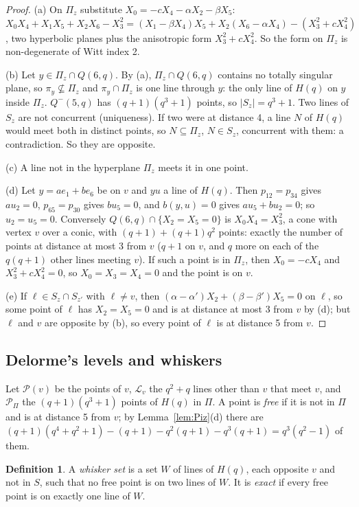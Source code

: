 \documentclass[11pt]{amsart}
\theoremstyle{definition}
\newtheorem{definition}[theorem]{Definition}
\theoremstyle{remark}
\numberwithin{equation}{section}
\newcommand{\cL}{\mathcal L}
\newcommand{\cP}{\mathcal P}
\begin{document}
\begin{proof}
(a) On $\Pi_z$ substitute $X_0=-cX_4-\alpha X_2-\beta X_5$:
$X_0X_4+X_1X_5+X_2X_6-X_3^2=(X_1-\beta X_4)X_5+X_2(X_6-\alpha X_4)-(X_3^2+cX_4^2)$, two hyperbolic planes plus the
anisotropic form $X_3^2+cX_4^2$. So the form on $\Pi_z$ is non-degenerate of Witt index 2.

(b) Let $y\in\Pi_z\cap Q(6,q)$. By (a), $\Pi_z\cap Q(6,q)$ contains no totally singular plane, so $\pi_y\not\subseteq\Pi_z$
and $\pi_y\cap\Pi_z$ is one line through $y$: the only line of $H(q)$ on $y$ inside $\Pi_z$. $Q^-(5,q)$ has
$(q+1)(q^3+1)$ points, so $|S_z|=q^3+1$. Two lines of $S_z$ are not concurrent (uniqueness). If two were at distance 4, a
line $N$ of $H(q)$ would meet both in distinct points, so $N\subseteq\Pi_z$, $N\in S_z$, concurrent with them: a
contradiction. So they are opposite.

(c) A line not in the hyperplane $\Pi_z$ meets it in one point.

(d) Let $y=ae_1+be_6$ be on $v$ and $yu$ a line of $H(q)$. Then $p_{12}=p_{34}$ gives $au_2=0$, $p_{65}=p_{30}$ gives
$bu_5=0$, and $b(y,u)=0$ gives $au_5+bu_2=0$; so $u_2=u_5=0$. Conversely $Q(6,q)\cap\{X_2=X_5=0\}$ is $X_0X_4=X_3^2$, a
cone with vertex $v$ over a conic, with $(q+1)+(q+1)q^2$ points: exactly the number of points at distance at most 3 from
$v$ ($q+1$ on $v$, and $q$ more on each of the $q(q+1)$ other lines meeting $v$). If such a point is in $\Pi_z$, then
$X_0=-cX_4$ and $X_3^2+cX_4^2=0$, so $X_0=X_3=X_4=0$ and the point is on $v$.

(e) If $\ell\in S_z\cap S_{z'}$ with $\ell\ne v$, then $(\alpha-\alpha')X_2+(\beta-\beta')X_5=0$ on $\ell$, so some point of
$\ell$ has $X_2=X_5=0$ and is at distance at most 3 from $v$ by (d); but $\ell$ and $v$ are opposite by (b), so every point
of $\ell$ is at distance 5 from $v$.
\end{proof}

\subsection{Delorme's levels and whiskers}
Let $\cP(v)$ be the points of $v$, $\cL_v$ the $q^2+q$ lines other than $v$ that meet $v$, and $\cP_\Pi$ the
$(q+1)(q^3+1)$ points of $H(q)$ in $\Pi$. A point is \emph{free} if it is not in $\Pi$ and is at distance 5 from $v$; by
Lemma~\ref{lem:Piz}(d) there are $(q+1)(q^4+q^2+1)-(q+1)-q^2(q+1)-q^3(q+1)=q^3(q^2-1)$ of them.

\begin{definition}\label{def:whiskers}
A \emph{whisker set} is a set $W$ of lines of $H(q)$, each opposite $v$ and not in $S$, such that no free point is on two
lines of $W$. It is \emph{exact} if every free point is on exactly one line of $W$.
\end{definition}
\end{document}
